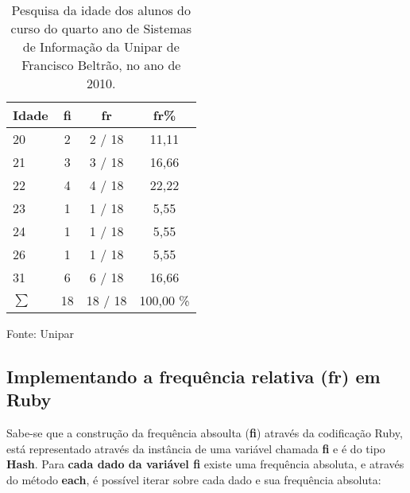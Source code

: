 \documentclass[12pt]{article}
\newcommand{\code}[1] {\textbf{#1}}
\begin{document}
\begin{table}
\caption{Pesquisa da idade dos alunos do curso do quarto ano de Sistemas de Informação da Unipar de Francisco Beltrão, no ano de 2010.}
\label{tabela FR percentual}
\begin{tabular}{|l|c|c|c|} 
\hline 

Idade &  \code{fi} & \code{fr}  & \code{fr\%} \\ \hline 
20    &      2       &      2 / 18  &   11,11  \\ 
21    &      3       &      3 / 18  &   16,66  \\
22    &      4       &      4 / 18  &   22,22  \\
23    &      1       &      1 / 18  &    5,55  \\
24    &      1       &      1 / 18  &    5,55  \\
26    &      1       &      1 / 18  &    5,55  \\
31    &      6       &      6 / 18  &   16,66  \\ 
\hline 
\begin{math}
\sum 
\end{math} & 18      &     18 / 18  & 100,00 \% \\
\hline 
\end{tabular}
\small{Fonte: Unipar}
\end{table}




\subsection { Implementando a frequência relativa (fr) em Ruby }

Sabe-se que a construção da frequência absoulta (\code{fi}) através da codificação Ruby, está representado através da instância de uma variável chamada \code{fi} e é do tipo \code{Hash}. Para \textbf{cada dado da variável fi} existe uma frequência absoluta,  e através do método \code{each}, é possível iterar sobre cada dado e sua frequência absoluta:

 
\end{document}

